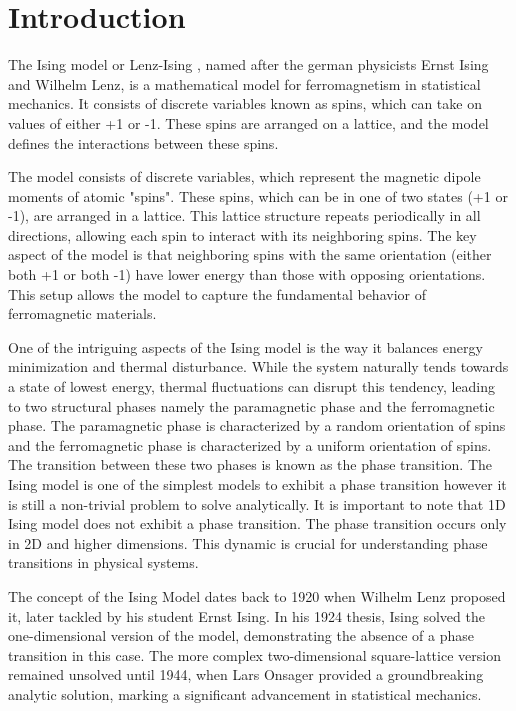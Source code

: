 \section{Introduction}

The Ising model or  Lenz-Ising \cite{Ising1925}, named after the german
physicists Ernst Ising and  Wilhelm Lenz, is a mathematical model for
ferromagnetism in statistical mechanics. It consists of discrete variables known
as spins, which can take on values of either +1 or -1. These spins are arranged
on a lattice, and the model defines the interactions between these spins.

The model consists of discrete variables, which represent the magnetic dipole
moments of atomic "spins". These spins, which can be in one of two states (+1 or
-1), are arranged in a lattice. This lattice structure repeats periodically in
all directions, allowing each spin to interact with its neighboring spins. The
key aspect of the model is that neighboring spins with the same orientation
(either both +1 or both -1) have lower energy than those with opposing
orientations. This setup allows the model to capture the fundamental behavior of
ferromagnetic materials.

One of the intriguing aspects of the Ising model is the way it balances energy
minimization and thermal disturbance. While the system naturally tends towards a
state of lowest energy, thermal fluctuations can disrupt this tendency, leading
to two structural phases namely the paramagnetic phase and the ferromagnetic
phase. The paramagnetic phase is characterized by a random orientation of spins
and the ferromagnetic phase is characterized by a uniform orientation of spins.
The transition between these two phases is known as the phase transition. The
Ising model is one of the simplest models to exhibit a phase transition however
it is still a non-trivial problem to solve analytically. It is important to note
that 1D Ising model does not exhibit a phase transition. The phase transition
occurs only in 2D and higher dimensions. This dynamic is crucial for
understanding phase transitions in physical systems.

The concept of the Ising Model dates back to 1920 when Wilhelm Lenz proposed it,
later tackled by his student Ernst Ising. In his 1924 thesis, Ising solved the
one-dimensional version of the model, demonstrating the absence of a phase
transition in this case. The more complex two-dimensional square-lattice version
remained unsolved until 1944, when Lars Onsager provided a groundbreaking
analytic solution, marking a significant advancement in statistical mechanics.
